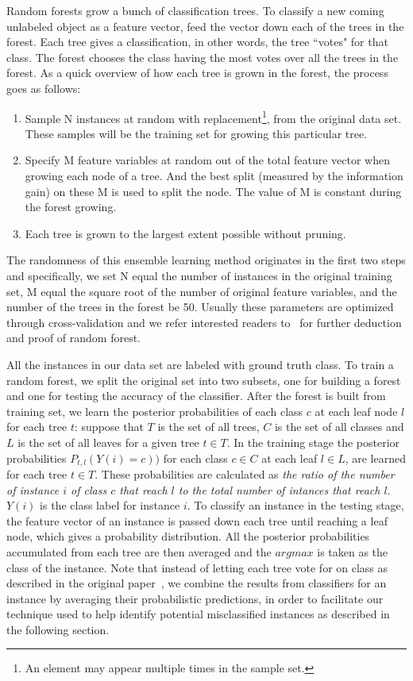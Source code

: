 Random forests grow a bunch of classification trees. To classify a new coming unlabeled object as a feature vector, 
feed the vector down each of the trees in the forest. Each tree gives a classification, in other words, the 
tree ``votes" for that class. The forest chooses the class having the most votes over all the trees in the forest. 
As a quick overview of how each tree is grown in the forest, the process goes as follows:
\begin{enumerate}
\item Sample N instances at random with replacement\footnote{An element may appear multiple times in the sample set.}, from the original data set. These samples will be the training set for growing this particular tree.
\item Specify M feature variables at random out of the total feature vector when growing each node of a tree. And the best split (measured by the information gain) on these M is used to split the node. The value of M is constant during the forest growing.
\item Each tree is grown to the largest extent possible without pruning.
\end{enumerate}
The randomness of this ensemble learning method originates in the first two steps and specifically, we set N equal the number of instances in the original training set, M equal the square root of the
number of original feature variables, and the number of the trees in the forest be 50. Usually these parameters are optimized
through cross-validation and we refer interested readers to~\cite{RF} for further deduction and proof of random forest.

All the instances in our data set are labeled with ground truth class. To train a random forest, we split the original set into two subsets, one for building 
a forest and one for testing the accuracy of the classifier. After the forest is built from training set, we learn the posterior probabilities of each class $c$ 
at each leaf node $l$ for each tree $t$: suppose that $T$ is the set of all trees, $C$ is the set of all classes and $L$ is the set of all leaves for a given 
tree $t\in T$. In the training stage the posterior probabilities $P_{t,l}(Y(i) = c))$ for each class $c\in C$ at each leaf $l\in L$, are learned for each tree $t\in T$. 
These probabilities are calculated as \textit{the ratio of the number of instance $i$ of class $c$ that reach $l$ to the total number of intances that reach $l$}. $Y(i)$ 
is the class label for instance $i$. To classify an instance in the testing stage, the feature vector of an instance is passed down each tree until reaching a leaf 
node, which gives a probability distribution. All the posterior probabilities accumulated from each tree are then averaged and the $argmax$ is taken as the class 
of the instance. Note that instead of letting each tree vote for on class as described in the original paper~\cite{RF}, we combine the results from classifiers for 
an instance by averaging their probabilistic predictions, in order to facilitate our technique used to help identify potential misclassified instances as described in the following section.  

